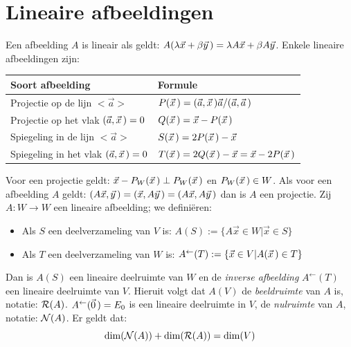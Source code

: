 \documentclass[twoside]{report}
\begin{document}
\section{Lineaire afbeeldingen}
Een afbeelding $A$ is lineair als geldt:
$A(\lambda\vec{x}+\beta\vec{y}\,)=\lambda A\vec{x}+\beta A\vec{y}$.
\npar
Enkele lineaire afbeeldingen zijn:
\begin{center}
\begin{tabular}{||p{7cm}|p{6cm}||}
\hline
\bf Soort afbeelding&\bf Formule\\
\hline
\hline
Projectie op de lijn $<\vec{a}>$              &$P(\vec{x}\,)=(\vec{a},\vec{x}\,)\vec{a}/(\vec{a},\vec{a}\,)$\\
Projectie op het vlak $(\vec{a},\vec{x}\,)=0$ &$Q(\vec{x}\,)=\vec{x}-P(\vec{x}\,)$\\
Spiegeling in de lijn $<\vec{a}>$             &$S(\vec{x}\,)=2P(\vec{x}\,)-\vec{x}$\\
Spiegeling in het vlak $(\vec{a},\vec{x}\,)=0$&$T(\vec{x}\,)=2Q(\vec{x}\,)-\vec{x}=\vec{x}-2P(\vec{x}\,)$\\
\hline
\end{tabular}
\end{center}
Voor een projectie geldt: $\vec{x}-P_W(\vec{x}\,)\perp P_W(\vec{x}\,)$ en
$P_W(\vec{x}\,)\in W$.
\npar
Als voor een afbeelding $A$ geldt: $(A\vec{x},\vec{y}\,)=(\vec{x},A\vec{y}\,)=(A\vec{x},A\vec{y}\,)$
dan is $A$ een projectie.
\npar
Zij $A:W\rightarrow W$ een lineaire afbeelding; we defini\"eren:
\begin{itemize}
\item Als $S$ een deelverzameling van $V$ is: $A(S):=\{A\vec{x}\in W|\vec{x}\in S\}$
\item Als $T$ een deelverzameling van $W$ is: $A^\leftarrow(T):=\{\vec{x}\in V|A(\vec{x}\,)\in T\}$
\end{itemize}
Dan is $A(S)$ een lineaire deelruimte van $W$ en de {\it inverse afbeelding}
$A^\leftarrow(T)$ een lineaire deelruimte van $V$. Hieruit volgt dat $A(V)$ de
{\it beeldruimte} van $A$ is, notatie: ${\cal R}(A)$. $A^\leftarrow(\vec{0}\,)=E_0$
is een lineaire deelruimte in $V$, de {\it nulruimte} van $A$, notatie:
${\cal N}(A)$.  Er geldt dat:
\[
{\rm dim}({\cal N}(A))+{\rm dim}({\cal R}(A))={\rm dim}(V)
\]
\end{document}
